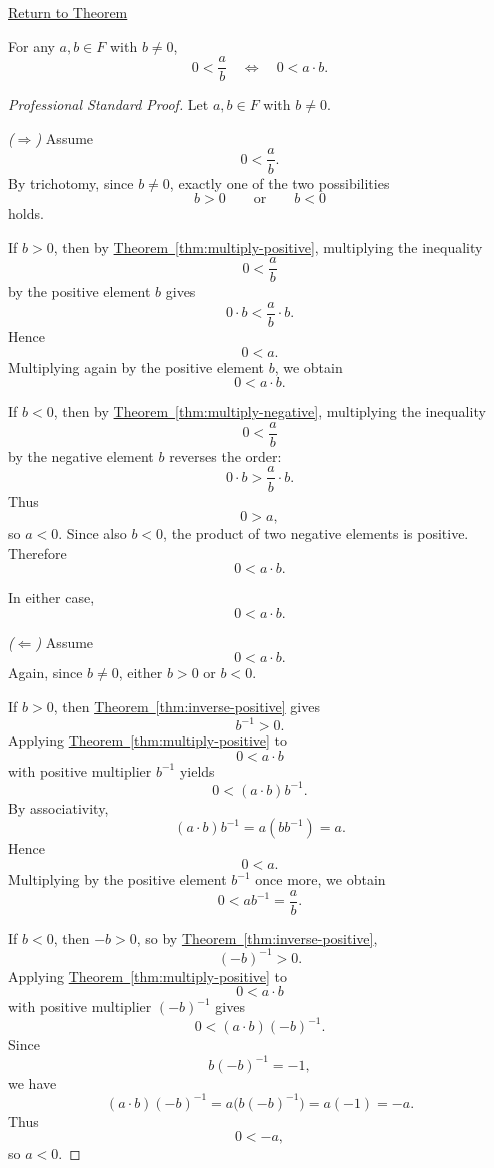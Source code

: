 \newpage
{}
\label{prf:positive-fraction-iff-positive-product}

\begin{remark*}[Return]
\hyperref[thm:positive-fraction-iff-positive-product]{Return to Theorem}
\end{remark*}

\begin{theorem*}
For any $a,b\in F$ with $b\neq 0$,
\[
0<\frac{a}{b}
\quad\Longleftrightarrow\quad
0<a\cdot b.
\]
\end{theorem*}

\begin{proof}[Professional Standard Proof]
\LRAProofBodyStart
Let $a,b\in F$ with $b\neq 0$.

\emph{($\Rightarrow$)} Assume
\[
0<\frac{a}{b}.
\]
By trichotomy, since $b\neq 0$, exactly one of the two possibilities
\[
b>0
\qquad\text{or}\qquad
b<0
\]
holds.

If $b>0$, then by
\hyperref[thm:multiply-positive]{Theorem~\ref*{thm:multiply-positive}},
multiplying the inequality
\[
0<\frac{a}{b}
\]
by the positive element $b$ gives
\[
0\cdot b<\frac{a}{b}\cdot b.
\]
Hence
\[
0<a.
\]
Multiplying again by the positive element $b$, we obtain
\[
0<a\cdot b.
\]

If $b<0$, then by
\hyperref[thm:multiply-negative]{Theorem~\ref*{thm:multiply-negative}},
multiplying the inequality
\[
0<\frac{a}{b}
\]
by the negative element $b$ reverses the order:
\[
0\cdot b>\frac{a}{b}\cdot b.
\]
Thus
\[
0>a,
\]
so $a<0$.  Since also $b<0$, the product of two negative elements is
positive.  Therefore
\[
0<a\cdot b.
\]

In either case,
\[
0<a\cdot b.
\]

\emph{($\Leftarrow$)} Assume
\[
0<a\cdot b.
\]
Again, since $b\neq 0$, either $b>0$ or $b<0$.

If $b>0$, then
\hyperref[thm:inverse-positive]{Theorem~\ref*{thm:inverse-positive}}
gives
\[
b^{-1}>0.
\]
Applying
\hyperref[thm:multiply-positive]{Theorem~\ref*{thm:multiply-positive}}
to
\[
0<a\cdot b
\]
with positive multiplier $b^{-1}$ yields
\[
0<(a\cdot b)b^{-1}.
\]
By associativity,
\[
(a\cdot b)b^{-1}=a(bb^{-1})=a.
\]
Hence
\[
0<a.
\]
Multiplying by the positive element $b^{-1}$ once more, we obtain
\[
0<ab^{-1}=\frac{a}{b}.
\]

If $b<0$, then $-b>0$, so by
\hyperref[thm:inverse-positive]{Theorem~\ref*{thm:inverse-positive}},
\[
(-b)^{-1}>0.
\]
Applying
\hyperref[thm:multiply-positive]{Theorem~\ref*{thm:multiply-positive}}
to
\[
0<a\cdot b
\]
with positive multiplier $(-b)^{-1}$ gives
\[
0<(a\cdot b)(-b)^{-1}.
\]
Since
\[
b(-b)^{-1}=-1,
\]
we have
\[
(a\cdot b)(-b)^{-1}=a\bigl(b(-b)^{-1}\bigr)=a(-1)=-a.
\]
Thus
\[
0<-a,
\]
so $a<0$.


\end{proof}
